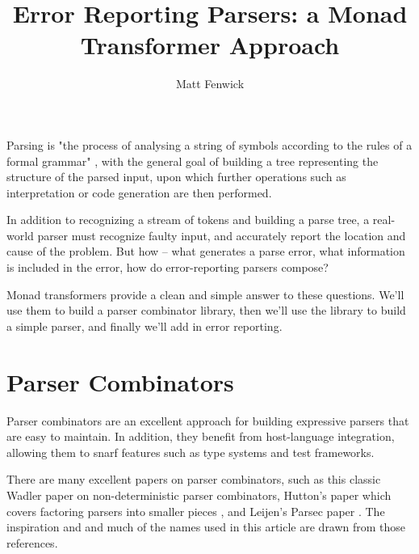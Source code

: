 \documentclass{tmr}
\title{Error Reporting Parsers:  a Monad Transformer Approach}
\author{Matt Fenwick\email{mfenwick100@@gmail.com}}
\begin{document}
\begin{introduction}
Parsing is "the process of analysing a string of symbols according to the rules
of a formal grammar" \cite{wikipedia_parsing}, with the general goal of building a tree
representing the structure of the parsed input, upon which further operations
such as interpretation or code generation are then performed.

In addition to recognizing a stream of tokens and building a parse tree, a
real-world parser must recognize faulty input, and accurately report the
location and cause of the problem.  But how -- what generates a parse error,
what information is included in the error, how do error-reporting parsers
compose?

Monad transformers provide a clean and simple answer to these questions.
We'll use them to build a parser combinator library, then we'll use the library
to build a simple parser, and finally we'll add in error reporting.
\end{introduction}




\section{Parser Combinators}
Parser combinators are an excellent approach for building expressive parsers 
that are easy to maintain.  In addition, they benefit from host-language
integration, allowing them to snarf features such as type systems and test 
frameworks.

There are many excellent papers on parser combinators, such
as this \cite{wadler} classic Wadler paper on non-deterministic parser combinators, 
Hutton's paper which covers factoring parsers into smaller pieces \cite{hutton}, 
and Leijen's Parsec paper \cite{leijen}.  
The inspiration and and much of the names used in this article are drawn 
from those references.
\end{document}
